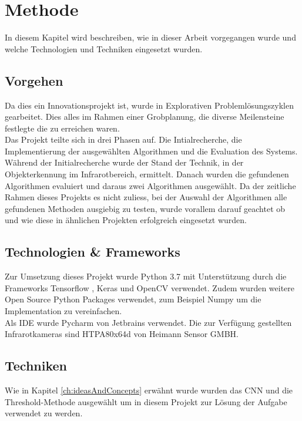 \chapter{Methode}

In diesem Kapitel wird beschreiben, wie in dieser Arbeit vorgegangen wurde und welche Technologien und Techniken eingesetzt wurden.


\section{Vorgehen}

Da dies ein Innovationsprojekt ist, wurde in Explorativen Problemlösungszyklen gearbeitet. Dies alles im Rahmen einer Grobplanung, die diverse Meilensteine festlegte die zu erreichen waren.\\
Das Projekt teilte sich in drei Phasen auf.  Die Intialrecherche, die Implementierung der ausgewählten Algorithmen und die Evaluation des Systems.\\
Während der Initialrecherche wurde der Stand der Technik, in der Objekterkennung im Infrarotbereich, ermittelt. Danach wurden die gefundenen Algorithmen evaluiert und daraus zwei Algorithmen ausgewählt. Da der zeitliche Rahmen dieses Projekts es nicht zuliess, bei der Auswahl der Algorithmen alle gefundenen Methoden ausgiebig zu testen, wurde vorallem darauf geachtet ob und wie diese in ähnlichen Projekten erfolgreich eingesetzt wurden.

\section{Technologien \& Frameworks}
Zur Umsetzung dieses Projekt wurde Python 3.7 mit Unterstützung durch die Frameworks Tensorflow \parencite{tensorflow2015}, Keras \parencite{keras} und OpenCV \parencite{opencv} verwendet. Zudem wurden weitere Open Source Python Packages verwendet, zum Beispiel Numpy \parencite{numpy} um die Implementation zu vereinfachen.\\
Als \gls{IDE} wurde Pycharm von Jetbrains \parencite{pycharm} verwendet. Die zur Verfügung gestellten Infrarotkameras sind HTPA80x64d von Heimann Sensor GMBH.

\section{Techniken}

Wie in Kapitel \ref{ch:ideasAndConcepts} erwähnt wurde wurden das \gls{CNN} und die Threshold-Methode ausgewählt um in diesem Projekt zur Lösung der Aufgabe verwendet zu werden. 

